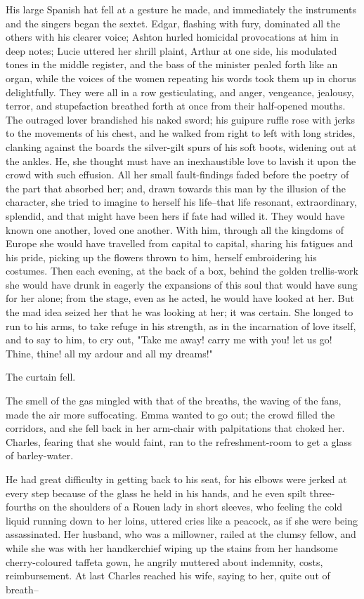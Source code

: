 \documentclass{tufte-book}
\begin{document}
His large Spanish hat fell at a gesture he made, and immediately the
instruments and the singers began the sextet. Edgar, flashing with fury,
dominated all the others with his clearer voice; Ashton hurled homicidal
provocations at him in deep notes; Lucie uttered her shrill plaint,
Arthur at one side, his modulated tones in the middle register, and the
bass of the minister pealed forth like an organ, while the voices of the
women repeating his words took them up in chorus delightfully. They were
all in a row gesticulating, and anger, vengeance, jealousy, terror, and
stupefaction breathed forth at once from their half-opened mouths. The
outraged lover brandished his naked sword; his guipure ruffle rose with
jerks to the movements of his chest, and he walked from right to left
with long strides, clanking against the boards the silver-gilt spurs of
his soft boots, widening out at the ankles. He, she thought must have an
inexhaustible love to lavish it upon the crowd with such effusion.
All her small fault-findings faded before the poetry of the part
that absorbed her; and, drawn towards this man by the illusion of the
character, she tried to imagine to herself his life--that life resonant,
extraordinary, splendid, and that might have been hers if fate had
willed it. They would have known one another, loved one another. With
him, through all the kingdoms of Europe she would have travelled from
capital to capital, sharing his fatigues and his pride, picking up the
flowers thrown to him, herself embroidering his costumes. Then each
evening, at the back of a box, behind the golden trellis-work she would
have drunk in eagerly the expansions of this soul that would have sung
for her alone; from the stage, even as he acted, he would have looked
at her. But the mad idea seized her that he was looking at her; it was
certain. She longed to run to his arms, to take refuge in his strength,
as in the incarnation of love itself, and to say to him, to cry out,
"Take me away! carry me with you! let us go! Thine, thine! all my ardour
and all my dreams!"

The curtain fell.

The smell of the gas mingled with that of the breaths, the waving of the
fans, made the air more suffocating. Emma wanted to go out; the
crowd filled the corridors, and she fell back in her arm-chair with
palpitations that choked her. Charles, fearing that she would faint, ran
to the refreshment-room to get a glass of barley-water.

He had great difficulty in getting back to his seat, for his elbows were
jerked at every step because of the glass he held in his hands, and
he even spilt three-fourths on the shoulders of a Rouen lady in short
sleeves, who feeling the cold liquid running down to her loins, uttered
cries like a peacock, as if she were being assassinated. Her husband,
who was a millowner, railed at the clumsy fellow, and while she was with
her handkerchief wiping up the stains from her handsome cherry-coloured
taffeta gown, he angrily muttered about indemnity, costs, reimbursement.
At last Charles reached his wife, saying to her, quite out of breath--
\end{document}
